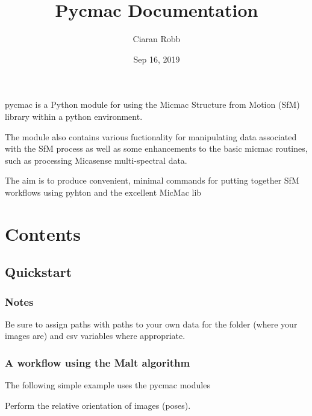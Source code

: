 \documentclass[letterpaper,10pt,english]{sphinxmanual}
\title{Pycmac Documentation}
\date{Sep 16, 2019}
\author{Ciaran Robb}
\begin{document}
\pagestyle{empty}
\sphinxmaketitle
\pagestyle{plain}
\sphinxtableofcontents
\pagestyle{normal}
\label{\detokenize{index::doc}}


pycmac is a Python module for using the Micmac Structure from Motion (SfM) library within a python environment.

The module also contains various fuctionality for manipulating data associated with the SfM process as well as some enhancements to the basic micmac routines, such as processing Micasense multi-spectral data.

The aim is to produce convenient, minimal commands for putting together SfM workflows using pyhton and the excellent MicMac lib


\chapter{Contents}
\label{\detokenize{index:contents}}

\section{Quickstart}
\label{\detokenize{quickstart:quickstart}}\label{\detokenize{quickstart:id1}}\label{\detokenize{quickstart::doc}}

\subsection{Notes}
\label{\detokenize{quickstart:notes}}
Be sure to assign paths with paths to your own data for the folder (where your images are) and csv variables where appropriate.


\subsection{A workflow using the Malt algorithm}
\label{\detokenize{quickstart:a-workflow-using-the-malt-algorithm}}
The following simple example uses the pycmac modules

\begin{sphinxVerbatim}[commandchars=\\\{\}]
    
\end{sphinxVerbatim}

Perform the relative orientation of images (poses).

\begin{sphinxVerbatim}[commandchars=\\\{\}]
  

     
\end{sphinxVerbatim}
\end{document}
